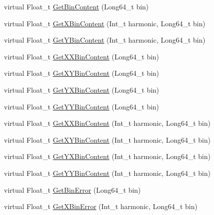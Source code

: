 \begin{DoxyCompactItemize}
\item 
virtual Float\+\_\+t \mbox{\hyperlink{classQn_1_1CorrectionHistogramBase_a9e4e745a6f4cbebf5b9277d6d63bc9c7}{Get\+Bin\+Content}} (Long64\+\_\+t bin)
\item 
virtual Float\+\_\+t \mbox{\hyperlink{classQn_1_1CorrectionHistogramBase_a3dc485a3ac0767a04691a228b3189b95}{Get\+X\+Bin\+Content}} (Int\+\_\+t harmonic, Long64\+\_\+t bin)
\item 
virtual Float\+\_\+t \mbox{\hyperlink{classQn_1_1CorrectionHistogramBase_acc898b8b375f88d0625798d3b9a9b9ba}{Get\+Y\+Bin\+Content}} (Int\+\_\+t harmonic, Long64\+\_\+t bin)
\item 
virtual Float\+\_\+t \mbox{\hyperlink{classQn_1_1CorrectionHistogramBase_a5ed53d98b57fa9e9ec4de78ae518d9d9}{Get\+X\+X\+Bin\+Content}} (Long64\+\_\+t bin)
\item 
virtual Float\+\_\+t \mbox{\hyperlink{classQn_1_1CorrectionHistogramBase_aa631b6234a81dbe46b29a95fda339b69}{Get\+X\+Y\+Bin\+Content}} (Long64\+\_\+t bin)
\item 
virtual Float\+\_\+t \mbox{\hyperlink{classQn_1_1CorrectionHistogramBase_a2bc9c26889a5ff0479f5638e2e253174}{Get\+Y\+X\+Bin\+Content}} (Long64\+\_\+t bin)
\item 
virtual Float\+\_\+t \mbox{\hyperlink{classQn_1_1CorrectionHistogramBase_a1ebb8ccb23cce80b276670617f4c03e5}{Get\+Y\+Y\+Bin\+Content}} (Long64\+\_\+t bin)
\item 
virtual Float\+\_\+t \mbox{\hyperlink{classQn_1_1CorrectionHistogramBase_ac28c760f664f1b52fb6bef3f85f7ce94}{Get\+X\+X\+Bin\+Content}} (Int\+\_\+t harmonic, Long64\+\_\+t bin)
\item 
virtual Float\+\_\+t \mbox{\hyperlink{classQn_1_1CorrectionHistogramBase_a88e6cd702547df1b8ea0fcc371dc090d}{Get\+X\+Y\+Bin\+Content}} (Int\+\_\+t harmonic, Long64\+\_\+t bin)
\item 
virtual Float\+\_\+t \mbox{\hyperlink{classQn_1_1CorrectionHistogramBase_a15d59d5e8f2aaa3e42a133fd4b0f8025}{Get\+Y\+X\+Bin\+Content}} (Int\+\_\+t harmonic, Long64\+\_\+t bin)
\item 
virtual Float\+\_\+t \mbox{\hyperlink{classQn_1_1CorrectionHistogramBase_a65c27d6aca78e2ada1be160c48958c3e}{Get\+Y\+Y\+Bin\+Content}} (Int\+\_\+t harmonic, Long64\+\_\+t bin)
\item 
virtual Float\+\_\+t \mbox{\hyperlink{classQn_1_1CorrectionHistogramBase_a50a7dd4c5bbe5e4d0e405365c2a9104d}{Get\+Bin\+Error}} (Long64\+\_\+t bin)
\item 
virtual Float\+\_\+t \mbox{\hyperlink{classQn_1_1CorrectionHistogramBase_af68a693d349023b08c412fea39b54dd9}{Get\+X\+Bin\+Error}} (Int\+\_\+t harmonic, Long64\+\_\+t bin)

\end{DoxyCompactItemize}
